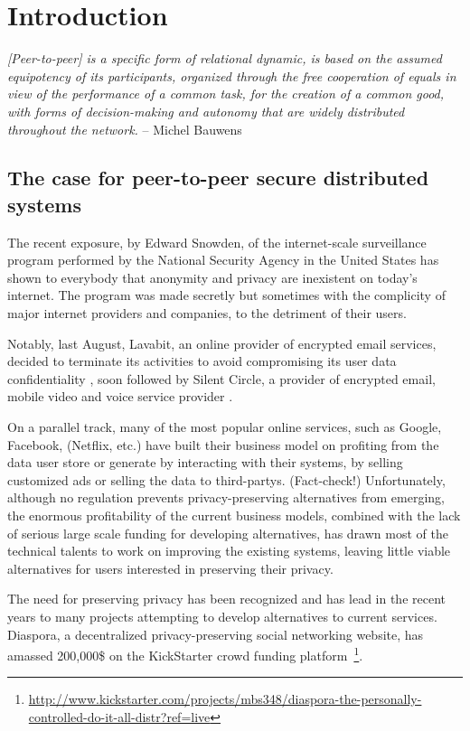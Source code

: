 \chapter{Introduction}

\textit{[Peer-to-peer] is a specific form of relational dynamic, is based on the assumed equipotency of its participants, organized through the free cooperation of equals in view of the performance of a common task, for the creation of a common good, with forms of decision-making and autonomy that are widely distributed throughout the network.} -- Michel Bauwens~\cite{p2pfoundation:definition}

\section{The case for peer-to-peer secure distributed systems}

The recent exposure, by Edward Snowden, of the internet-scale surveillance program performed by the National Security Agency in the United States \cite{} has shown to everybody that anonymity and privacy are inexistent on today's internet. The program was made secretly but sometimes with the complicity of major internet providers and companies, to the detriment of their users.

Notably, last August, Lavabit, an online provider of encrypted email services, decided to terminate its activities to avoid compromising its user data confidentiality \cite{}, soon followed by Silent Circle, a provider of encrypted email, mobile video and voice service provider \cite{}.

On a parallel track, many of the most popular online services, such as Google, Facebook, (Netflix, etc.) have built their business model on profiting from the data user store or generate by interacting with their systems, by selling customized ads or selling the data to third-partys. (Fact-check!) Unfortunately, although no regulation prevents privacy-preserving alternatives from emerging, the enormous profitability of the current business models, combined with the lack of serious large scale funding for developing alternatives, has drawn most of the technical talents to work on improving the existing systems, leaving little viable alternatives for users interested in preserving their privacy.

The need for preserving privacy has been recognized and has lead in the recent years to many projects attempting to develop alternatives to current services. Diaspora, a decentralized privacy-preserving social networking website, has amassed 200,000\$ on the KickStarter crowd funding platform~\footnote{\url{http://www.kickstarter.com/projects/mbs348/diaspora-the-personally-controlled-do-it-all-distr?ref=live}}.

